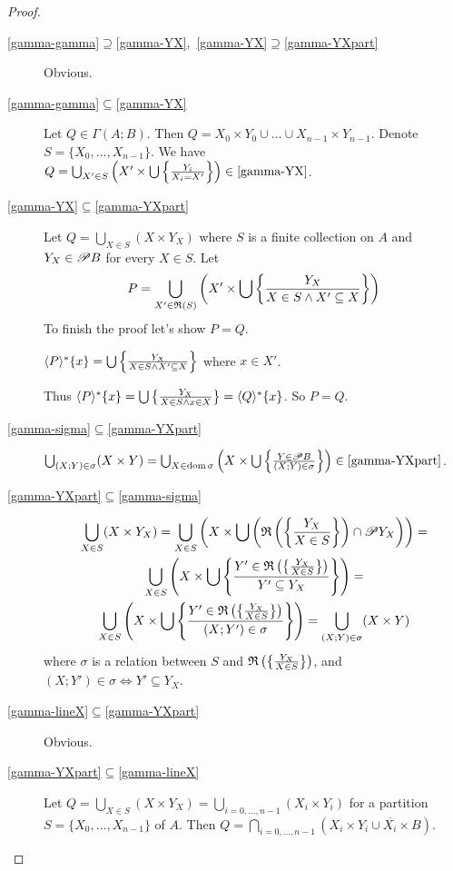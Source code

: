 \begin{proof}
~
\begin{description}
\item [{\ref{gamma-gamma}$\supseteq$\ref{gamma-YX},~\ref{gamma-YX}$\supseteq$\ref{gamma-YXpart}}] Obvious.
\item [{\ref{gamma-gamma}$\subseteq$\ref{gamma-YX}}] Let $Q\in\Gamma(A;B)$.
Then $Q=X_{0}\times Y_{0}\cup\ldots\cup X_{n-1}\times Y_{n-1}$. Denote
$S=\{X_{0},\ldots,X_{n-1}\}$. We have $Q=\bigcup_{X'\in S}\left(X'\times\bigcup\left\{ \frac{Y_{i}}{X_{i}=X'}\right\}\right)\in\text{\ref{gamma-YX}}$.
\item [{\ref{gamma-YX}$\subseteq$\ref{gamma-YXpart}}] Let $Q=\bigcup_{X\in S}(X\times Y_{X})$
where $S$ is a finite collection on $A$ and $Y_{X}\in\mathscr{P} B$
for every $X\in S$. Let 
\[
P=\bigcup_{X'\in\mathfrak{R}(S)}\left(X'\times\bigcup\left\{ \frac{Y_{X}}{X\in S\wedge X'\subseteq X}\right\}\right)
\]
To finish the proof let's show $P=Q$.


$\langle P\rangle^{\ast}\{x\}=\bigcup\left\{ \frac{Y_{X}}{X\in S\wedge X'\subseteq X}\right\}$
where $x\in X'$.


Thus $\langle P\rangle^{\ast}\{x\}=\bigcup\left\{ \frac{Y_{X}}{X\in S\wedge x\in X}\right\}=\langle Q\rangle^{\ast}\{x\}$.
So $P=Q$.

\item [{\ref{gamma-sigma}$\subseteq$\ref{gamma-YXpart}}] $\bigcup_{(X;Y)\in\sigma}(X\times Y)=\bigcup_{X\in\operatorname{dom}\sigma}\left(X\times\bigcup\left\{ \frac{Y\in\mathscr{P} B}{(X;Y)\in\sigma}\right\}\right)\in\text{\text{\ref{gamma-YXpart}}}$.
\item [{\ref{gamma-YXpart}$\subseteq$\ref{gamma-sigma}}] 
\begin{multline*}
\bigcup_{X\in S}(X\times Y_{X})=\bigcup_{X\in S}\left(X\times\bigcup\left(\mathfrak{R}\left(\left\{ \frac{Y_{X}}{X\in S}\right\}\right)\cap\mathscr{P} Y_{X}\right)\right)=\\
\bigcup_{X\in S}\left(X\times\bigcup\left\{ \frac{Y'\in\mathfrak{R}\left(\left\{ \frac{Y_{X}}{X\in S}\right\}\right)}{Y'\subseteq Y_{X}}\right\}\right)=\\
\bigcup_{X\in S}\left(X\times\bigcup\left\{ \frac{Y'\in\mathfrak{R}\left(\left\{ \frac{Y_{X}}{X\in S}\right\}\right)}{(X;Y')\in\sigma}\right\}\right)=\bigcup_{(X;Y)\in\sigma}(X\times Y)
\end{multline*}
 where $\sigma$ is a relation between $S$ and $\mathfrak{R}\left(\left\{ \frac{Y_{X}}{X\in S}\right\}\right)$,
and $(X;Y')\in\sigma\Leftrightarrow Y'\subseteq Y_{X}$.
\item [{\ref{gamma-lineX}$\subseteq$\ref{gamma-YXpart}}] Obvious.
\item [{\ref{gamma-YXpart}$\subseteq$\ref{gamma-lineX}}] Let $Q=\bigcup_{X\in S}(X\times Y_{X})=\bigcup_{i=0,\ldots,n-1}(X_{i}\times Y_{i})$
for a partition $S=\{X_{0},\ldots,X_{n-1}\}$ of $A$. Then $Q=\bigcap_{i=0,\ldots,n-1}\left(X_{i}\times Y_{i}\cup\overline{X_{i}}\times B\right)$.
\end{description}
\end{proof}
